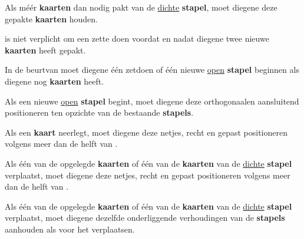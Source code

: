 \vervolgLijst{}
\item Als \eenSpeler méér \textbf{kaarten} dan nodig pakt van de \ul{dichte} \textbf{stapel}, moet diegene deze gepakte \textbf{kaarten} houden.
\eindLijst{}

\vervolgLijst{}
\item \EenSpeler is niet verplicht om een zet\footnotemark[4] te doen voordat en nadat diegene twee nieuwe \textbf{kaarten} heeft gepakt.
\eindLijst{}

\vervolgLijst{}
\item In de beurt\footnotemark[1] van \eenSpeler moet diegene \'e\'en zet\footnotemark[4] doen of \'e\'en nieuwe \ul{open} \textbf{stapel} beginnen als diegene nog \textbf{kaarten} heeft.
\eindLijst{}


\newpage
{}


\vervolgLijst{}
\item Als \eenSpeler een nieuwe \ul{open} \textbf{stapel} begint, moet diegene deze orthogonaal\footnotemark[1] en aansluitend positioneren ten opzichte van de bestaande \textbf{stapels}.
\label{regel:kaart_netjes_1}
\eindLijst{}

\vervolgLijst{}
\item Als \eenSpeler een \textbf{kaart} neerlegt, moet diegene deze netjes, recht en gepast positioneren volgens meer dan de helft van \alleSpelersN.
\label{regel:kaart_netjes_2}
\eindLijst{}

\vervolgLijst{}
\item Als \eenSpeler één van de opgelegde \textbf{kaarten} of één van de \textbf{kaarten} van de \ul{dichte} \textbf{stapel} verplaatst, moet diegene deze netjes, recht en gepast positioneren volgens meer dan de helft van \alleSpelersN.
\label{regel:kaart_netjes_3}
\eindLijst{}

\vervolgLijst{}
\item Als \eenSpeler één van de opgelegde \textbf{kaarten} of één van de \textbf{kaarten} van de \ul{dichte} \textbf{stapel} verplaatst, moet diegene dezelfde onderliggende verhoudingen van de \textbf{stapels} aanhouden als voor het verplaatsen.
\label{regel:kaart_netjes_4}
\eindLijst{}

